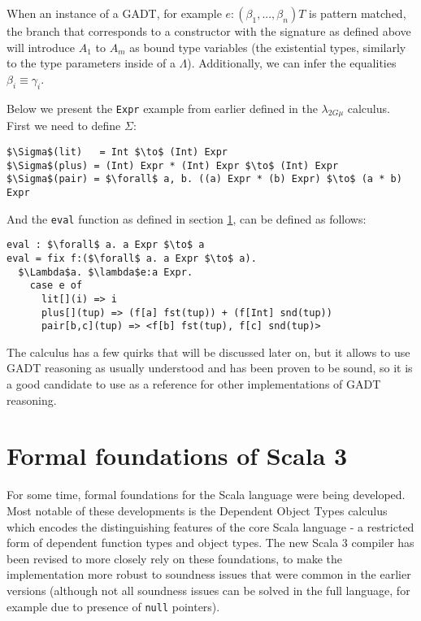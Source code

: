 When an instance of a GADT, for example $e: (\beta_1, ..., \beta_n) T$ is pattern matched, the branch that corresponds to a constructor with the signature as defined above will introduce $A_1$ to $A_m$ as bound type variables (the existential types, similarly to the type parameters inside of a $\Lambda$). Additionally, we can infer the equalities $\beta_i \equiv \gamma_i$.

Below we present the \texttt{Expr} example from earlier defined in the $\lambda_{2G\mu}$ calculus. First we need to define $\Sigma$:

\begin{lstlisting}[mathescape=true, basicstyle=\ttfamily]
$\Sigma$(lit)   = Int $\to$ (Int) Expr
$\Sigma$(plus) = (Int) Expr * (Int) Expr $\to$ (Int) Expr
$\Sigma$(pair) = $\forall$ a, b. ((a) Expr * (b) Expr) $\to$ (a * b) Expr
\end{lstlisting}

And the \texttt{eval} function as defined in section \ref{}, can be defined as follows:

\begin{lstlisting}[mathescape=true, basicstyle=\ttfamily]
eval : $\forall$ a. a Expr $\to$ a
eval = fix f:($\forall$ a. a Expr $\to$ a).
  $\Lambda$a. $\lambda$e:a Expr.
    case e of
      lit[](i) => i
      plus[](tup) => (f[a] fst(tup)) + (f[Int] snd(tup))
      pair[b,c](tup) => <f[b] fst(tup), f[c] snd(tup)>
\end{lstlisting}

The calculus has a few quirks that will be discussed later on, but it allows to use GADT reasoning as usually understood and has been proven to be sound, so it is a good candidate to use as a reference for other implementations of GADT reasoning.

\section{Formal foundations of Scala 3}

For some time, formal foundations for the Scala language were being developed. Most notable of these developments is the Dependent Object Types calculus \cite{EssenceDOT} which encodes the distinguishing features of the core Scala language  - a restricted form of dependent function types and object types. The new Scala 3 compiler has been revised to more closely rely on these foundations, to make the implementation more robust to soundness issues that were common in the earlier versions (although not all soundness issues can be solved in the full language, for example due to presence of \texttt{null} pointers).

